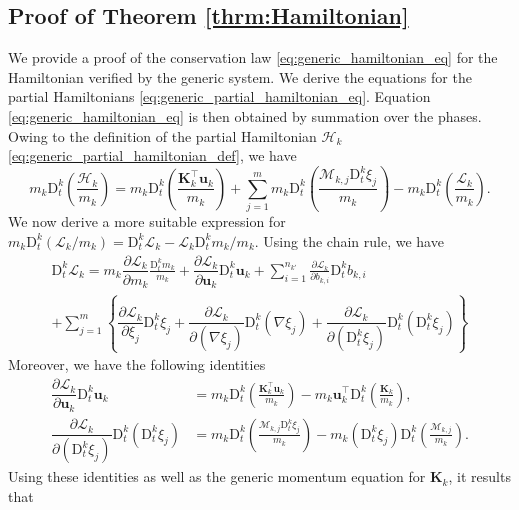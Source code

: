 \documentclass{myclass}
\newcommand{\Lag}{\mathscr{L}}
\newcommand{\Ham}{\mathcal{H}}
\newcommand{\Dt}{\mathrm{D}_t}
\newcommand{\vel}{\bm{u}}
\newcommand{\pth}[1]  {\left( #1 \right)}
\newcommand{\acco}[1]{\left\{ #1 \right\}}
\begin{document}
\subsection{Proof of Theorem \ref{thrm:Hamiltonian}}
We provide a proof of the conservation law \eqref{eq:generic_hamiltonian_eq} for the Hamiltonian verified by the generic system. We derive the equations for the partial Hamiltonians \eqref{eq:generic_partial_hamiltonian_eq}. Equation \eqref{eq:generic_hamiltonian_eq} is then obtained by summation over the phases. Owing to the definition of the partial Hamiltonian $\Ham_k$ \eqref{eq:generic_partial_hamiltonian_def}, we have
\begin{equation}
m_k\Dt^k\pth{\frac{\Ham_k}{m_k}} = m_k\Dt^k\pth{\frac{\bm{K}_k^\top\vel_k}{m_k}} + \sum_{j=1}^{m}m_k\Dt^k\pth{\dfrac{\mathscr{M}_{k,j}\Dt^k\xi_j}{m_k}} - m_k\Dt^k\pth{\dfrac{\Lag_k}{m_k}}.
\end{equation}
We now derive a more suitable expression for $m_k\Dt^k\pth{\Lag_k/m_k} = \Dt^k\Lag_k - \Lag_k \Dt^k m_k/ m_k$. Using the chain rule, we have
\begin{multline}
\Dt^k\Lag_k = m_k\dfrac{\partial\Lag_k}{\partial m_k}\frac{\Dt^k m_k}{m_k} + \dfrac{\partial\Lag_k}{\partial\vel_k}\Dt^k\vel_k + \sum_{i=1}^{n_{k'}}\frac{\partial\Lag_k}{\partial b_{k,i}}\Dt^k b_{k,i} \\ + \sum_{j=1}^{m}\acco{\dfrac{\partial\Lag_k}{\partial\xi_j}\Dt^k\xi_j + \dfrac{\partial\Lag_k}{\partial\pth{\nabla\xi_j}}\Dt^k\pth{\nabla\xi_j} + \dfrac{\partial\Lag_k}{\partial\pth{\Dt^k\xi_j}}\Dt^k\pth{\Dt^k\xi_j}}
\end{multline}
Moreover, we have the following identities
\begin{align}
\dfrac{\partial\Lag_k}{\partial\vel_k}\Dt^k\vel_k &= m_k\Dt^k\pth{\frac{\bm{K}_k^\top\vel_k}{m_k}} - m_k\vel_k^\top\Dt^k\pth{\frac{\bm{K}_k}{m_k}},\\\dfrac{\partial\Lag_k}{\partial\pth{\Dt^k\xi_j}}\Dt^k\pth{\Dt^k\xi_j} &= m_k\Dt^k\pth{\frac{\mathscr{M}_{k,j}\Dt^k\xi_j}{m_k}} - m_k\pth{\Dt^k\xi_j}\Dt^k\pth{\frac{\mathscr{M}_{k,j}}{m_k}}.
\end{align}
Using these identities as well as the generic momentum equation for $\bm{K}_k$, it results that
\end{document}
